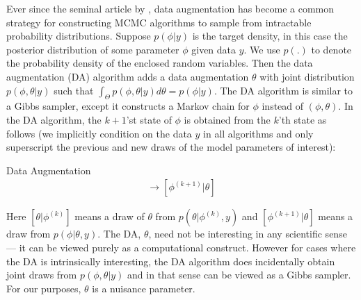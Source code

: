 \documentclass{article}
\begin{document}
Ever since the seminal article by , data augmentation has become a common strategy for constructing MCMC algorithms to sample from intractable probability distributions. Suppose $p(\phi|y)$ is the target density, in this case the posterior distribution of some parameter $\phi$ given data $y$. We use $p(.)$ to denote the probability density of the enclosed random variables. Then the data augmentation (DA) algorithm adds a data augmentation $\theta$ with joint distribution $p(\phi,\theta|y)$ such that $\int_{\Theta}p(\phi,\theta|y)d\theta = p(\phi|y)$. The DA algorithm is similar to a Gibbs sampler, except it constructs a Markov chain for $\phi$ instead of $(\phi, \theta)$. In the DA algorithm, the $k+1$'st state of $\phi$ is obtained from the $k$'th state as follows (we implicitly condition on the data $y$ in all algorithms and only superscript the previous and new draws of the model parameters of interest):
\begin{alg*}[DA]Data Augmentation\label{alg:DA}
  \begin{align*}
  [\theta|\phi^{(k)}] \to [\phi^{(k+1)}|\theta]
\end{align*}
\end{alg*} 
\noindent Here $[\theta|\phi^{(k)}]$ means a draw of $\theta$ from $p(\theta|\phi^{(k)},y)$ and $[\phi^{(k+1)}|\theta]$ means a draw from $p(\phi|\theta,y)$. The DA, $\theta$, need not be interesting in any scientific sense --- it can be viewed purely as a computational construct. However for cases where the DA is intrinsically interesting, the DA algorithm does incidentally obtain joint draws from $p(\phi,\theta|y)$ and in that sense can be viewed as a Gibbs sampler. For our purposes, $\theta$ is a nuisance parameter.
\end{document}
